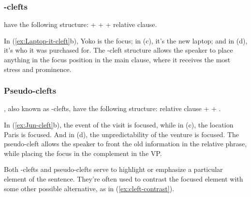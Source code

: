 \subsubsection*{-clefts}
 have the following structure:  +  +  + relative clause.

\ea \label{ex:Laptop-it-cleft}
    \z
\z
In (\ref{ex:Laptop-it-cleft}b), Yoko is the focus; in (c), it's the new laptop; and in (d), it's who it was purchased for. The -cleft structure allows the speaker to place anything in the focus position in the main clause, where it receives the most stress and prominence.

\subsubsection*{Pseudo-clefts}
, also known as -clefts, have the following structure: relative clause +  + .

\ea \label{ex:Jun-cleft}
    \z
\z
In (\ref{ex:Jun-cleft}b), the event of the visit is focused, while in (c), the location Paris is focused. And in (d), the unpredictability of the venture is focused. The pseudo-cleft allows the speaker to front the old information in the relative phrase, while placing the focus in the complement in the  VP.

Both -clefts and pseudo-clefts serve to highlight or emphasize a particular element of the sentence. They're often used to contrast the focused element with some other possible alternative, as in (\ref{ex:cleft-contrast}).

\ea \label{ex:cleft-contrast}
    \z
\z
{}

